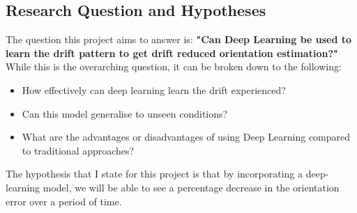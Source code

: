 \subsection{Research Question and Hypotheses}
\label{sec:question}
The question this project aims to answer is: \textbf{"Can Deep Learning be used to learn the drift 
pattern to get drift reduced orientation estimation?"} While this is the overarching question, it can be 
broken down to the following:
\begin{itemize}
  \item How effectively can deep learning learn the drift experienced?
  \item Can this model generalise to unseen conditions?
  \item What are the advantages or disadvantages of using Deep Learning compared to traditional
    approaches? 
\end{itemize}

The hypothesis that I state for this project is that by incorporating a deep-learning 
model, we will be able to see a percentage decrease in the orientation error
over a period of time. 